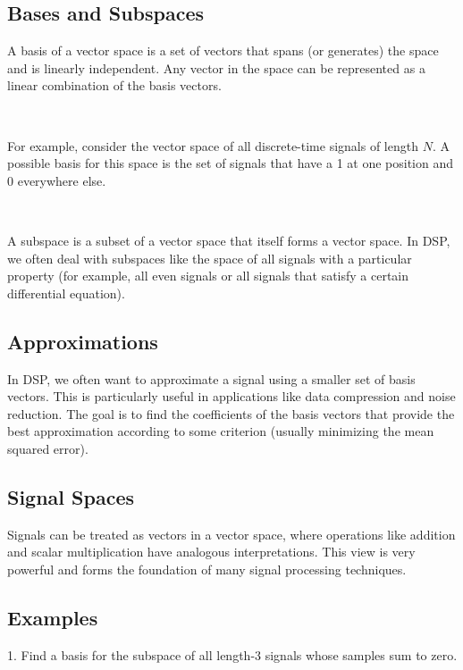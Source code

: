 \documentclass[11pt]{article}
\begin{document}
\subsection*{Bases and Subspaces}

A basis of a vector space is a set of vectors that spans (or generates) the space and is linearly independent. Any vector in the space can be represented as a linear combination of the basis vectors. 

\ 


For example, consider the vector space of all discrete-time signals of length $N$. A possible basis for this space is the set of signals that have a 1 at one position and 0 everywhere else.

\ 


A subspace is a subset of a vector space that itself forms a vector space. In DSP, we often deal with subspaces like the space of all signals with a particular property (for example, all even signals or all signals that satisfy a certain differential equation).

\subsection*{Approximations}

In DSP, we often want to approximate a signal using a smaller set of basis vectors. This is particularly useful in applications like data compression and noise reduction. The goal is to find the coefficients of the basis vectors that provide the best approximation according to some criterion (usually minimizing the mean squared error).

\subsection*{Signal Spaces}

Signals can be treated as vectors in a vector space, where operations like addition and scalar multiplication have analogous interpretations. This view is very powerful and forms the foundation of many signal processing techniques.

\subsection*{Examples}

1. Find a basis for the subspace of all length-3 signals whose samples sum to zero.

\ 
\end{document}
